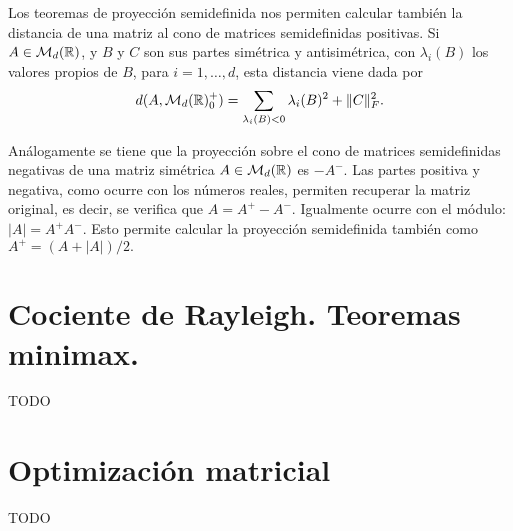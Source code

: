 \begin{remark}
    Los teoremas de proyección semidefinida nos permiten calcular también la distancia de una matriz al cono de matrices semidefinidas positivas. Si $A \in \mathcal{M}_d(\mathbb{R})$, y $B$ y $C$ son sus partes simétrica y antisimétrica, con $\lambda_i(B)$ los valores propios de $B$, para $i = 1,\dots,d$, esta distancia viene dada por
    \[ d(A,\mathcal{M}_d(\mathbb{R})^+_0) = \sum_{\lambda_i(B) < 0} \lambda_i(B)^2 + \|C\|^2_F.  \]
\end{remark}

\begin{remark}
    Análogamente se tiene que la proyección sobre el cono de matrices semidefinidas negativas de una matriz simétrica $A \in \mathcal{M}_d(\mathbb{R})$ es $-A^-$. Las partes positiva y negativa, como ocurre con los números reales, permiten recuperar la matriz original, es decir, se verifica que $A = A^+ - A^-$. Igualmente ocurre con el módulo: $|A| = A^+ A^-$. Esto permite calcular la proyección semidefinida también como $A^+ = (A + |A|)/2.$
\end{remark}

\section{Cociente de Rayleigh. Teoremas minimax.}

TODO

\section{Optimización matricial}

TODO